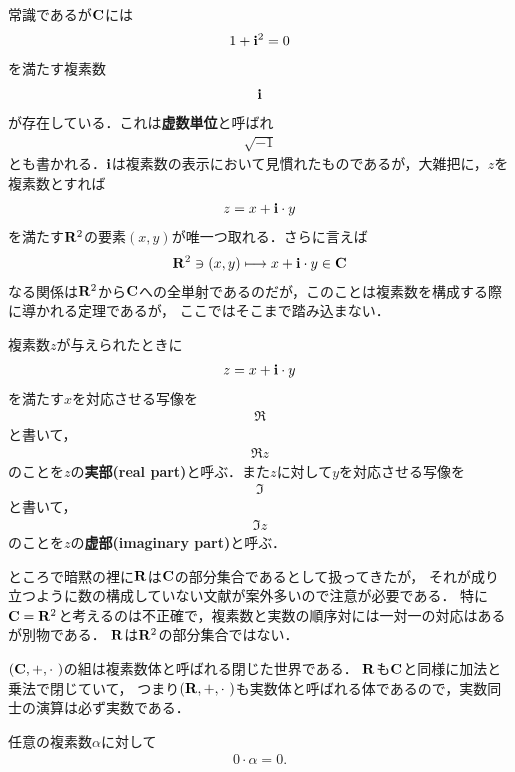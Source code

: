 	常識であるが$\mathbf{C}$には
	\begin{align}
		1 + \mathbf{i}^2 = 0
	\end{align}
	を満たす複素数
	\begin{align}
		\mathbf{i}
	\end{align}
	が存在している．これは{\bf 虚数単位}と呼ばれ
	\begin{align}
		\sqrt{-1}
	\end{align}
	とも書かれる．$\mathbf{i}$は複素数の表示において見慣れたものであるが，大雑把に，$z$を複素数とすれば
	\begin{align}
		z = x + \mathbf{i} \cdot y
	\end{align}
	を満たす$\mathbf{R}^2$の要素$(x,y)$が唯一つ取れる．さらに言えば
	\begin{align}
		\mathbf{R}^2 \ni (x,y) \longmapsto x + \mathbf{i} \cdot y \in \mathbf{C}
	\end{align}
	なる関係は$\mathbf{R}^2$から$\mathbf{C}$への全単射であるのだが，このことは複素数を構成する際に導かれる定理であるが，
	ここではそこまで踏み込まない．
	
	複素数$z$が与えられたときに
	\begin{align}
		z = x + \mathbf{i} \cdot y
	\end{align}
	を満たす$x$を対応させる写像を
	\begin{align}
		\Re
	\end{align}
	と書いて，
	\begin{align}
		\Re{z}
	\end{align}
	のことを$z$の{\bf 実部}{\bf (real part)}と呼ぶ．また$z$に対して$y$を対応させる写像を
	\begin{align}
		\Im
	\end{align}
	と書いて，
	\begin{align}
		\Im{z}
	\end{align}
	のことを$z$の{\bf 虚部}{\bf (imaginary part)}と呼ぶ．
	
	ところで暗黙の裡に$\mathbf{R}$は$\mathbf{C}$の部分集合であるとして扱ってきたが，
	それが成り立つように数の構成していない文献が案外多いので注意が必要である．
	特に$\mathbf{C} = \mathbf{R}^2$と考えるのは不正確で，複素数と実数の順序対には一対一の対応はあるが別物である．
	$\mathbf{R}$は$\mathbf{R}^2$の部分集合ではない．
	
	$(\C,+,\cdot\ )$の組は複素数体と呼ばれる閉じた世界である．
	$\mathbf{R}$も$\mathbf{C}$と同様に加法と乗法で閉じていて，
	つまり$(\R,+,\cdot\ )$も実数体と呼ばれる体であるので，実数同士の演算は必ず実数である．
	
	\begin{screen}
		\begin{thm}[$0$は乗法に関して逆元を持たない]
			任意の複素数$\alpha$に対して
			\begin{align}
				0 \cdot \alpha = 0.
			\end{align}
		\end{thm}
	\end{screen}
	
